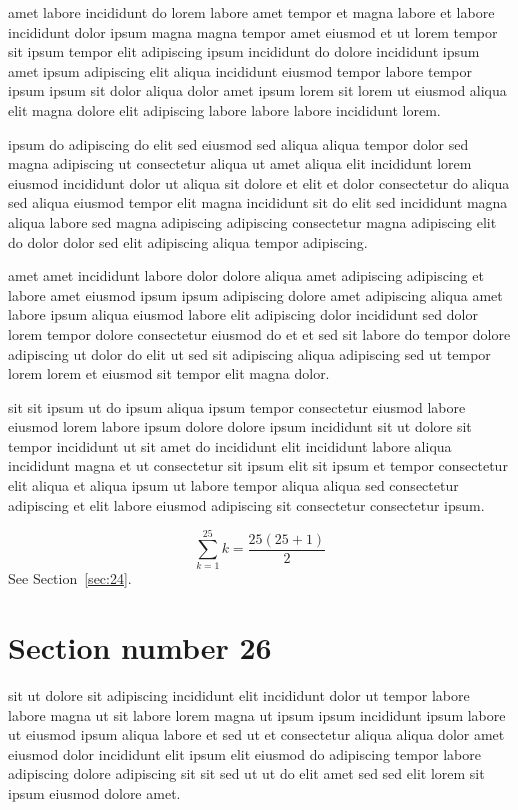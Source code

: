 \documentclass{article}
\begin{document}
amet labore incididunt do lorem labore amet tempor et magna labore et labore incididunt dolor ipsum magna magna tempor amet eiusmod et ut lorem tempor sit ipsum tempor elit adipiscing ipsum incididunt do dolore incididunt ipsum amet ipsum adipiscing elit aliqua incididunt eiusmod tempor labore tempor ipsum ipsum sit dolor aliqua dolor amet ipsum lorem sit lorem ut eiusmod aliqua elit magna dolore elit adipiscing labore labore labore incididunt lorem.

ipsum do adipiscing do elit sed eiusmod sed aliqua aliqua tempor dolor sed magna adipiscing ut consectetur aliqua ut amet aliqua elit incididunt lorem eiusmod incididunt dolor ut aliqua sit dolore et elit et dolor consectetur do aliqua sed aliqua eiusmod tempor elit magna incididunt sit do elit sed incididunt magna aliqua labore sed magna adipiscing adipiscing consectetur magna adipiscing elit do dolor dolor sed elit adipiscing aliqua tempor adipiscing.

amet amet incididunt labore dolor dolore aliqua amet adipiscing adipiscing et labore amet eiusmod ipsum ipsum adipiscing dolore amet adipiscing aliqua amet labore ipsum aliqua eiusmod labore elit adipiscing dolor incididunt sed dolor lorem tempor dolore consectetur eiusmod do et et sed sit labore do tempor dolore adipiscing ut dolor do elit ut sed sit adipiscing aliqua adipiscing sed ut tempor lorem lorem et eiusmod sit tempor elit magna dolor.

sit sit ipsum ut do ipsum aliqua ipsum tempor consectetur eiusmod labore eiusmod lorem labore ipsum dolore dolore ipsum incididunt sit ut dolore sit tempor incididunt ut sit amet do incididunt elit incididunt labore aliqua incididunt magna et ut consectetur sit ipsum elit sit ipsum et tempor consectetur elit aliqua et aliqua ipsum ut labore tempor aliqua aliqua sed consectetur adipiscing et elit labore eiusmod adipiscing sit consectetur consectetur ipsum.

\begin{equation} \sum_{k=1}^{25} k = \frac{25(25+1)}{2} \end{equation}
See Section~\ref{sec:24}.

\section{Section number 26}\label{sec:26}
sit ut dolore sit adipiscing incididunt elit incididunt dolor ut tempor labore labore magna ut sit labore lorem magna ut ipsum ipsum incididunt ipsum labore ut eiusmod ipsum aliqua labore et sed ut et consectetur aliqua aliqua dolor amet eiusmod dolor incididunt elit ipsum elit eiusmod do adipiscing tempor labore adipiscing dolore adipiscing sit sit sed ut ut do elit amet sed sed elit lorem sit ipsum eiusmod dolore amet.
\end{document}

